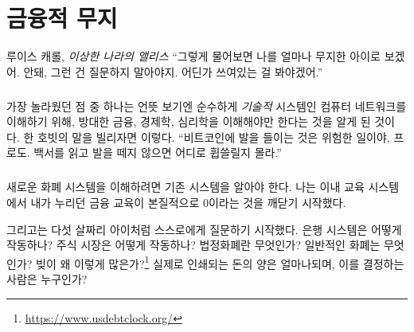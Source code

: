 \chapter{금융적 무지}
\label{les:8}

\begin{chapquote}{루이스 캐롤, \textit{이상한 나라의 앨리스}}
	\enquote{그렇게 물어보면 나를 얼마나 무지한 아이로 보겠어. 안돼, 그런 건 질문하지 말아야지. 어딘가 쓰여있는 걸 봐야겠어.}
\end{chapquote}

\paragraph{}
가장 놀라웠던 점 중 하나는 언뜻 보기엔 순수하게 \textit{기술적} 시스템인 컴퓨터 네트워크를 이해하기 위해, 
방대한 금융, 경제학, 심리학을 이해해야만 한다는 것을 알게 된 것이다.
한 호빗의 말을 빌리자면 이렇다. 
\enquote{비트코인에 발을 들이는 것은 위험한 일이야, 프로도. 백서를 읽고 발을 떼지 않으면 어디로 휩쓸릴지 몰라.}

\paragraph{}
새로운 화폐 시스템을 이해하려면 기존 시스템을 알아야 한다.  
나는 이내 교육 시스템에서 내가 누리던 금융 교육이 본질적으로 0이라는 것을 깨닫기 시작했다. 


그리고는 다섯 살짜리 아이처럼 스스로에게 질문하기 시작했다. 
은행 시스템은 어떻게 작동하나? 주식 시장은 어떻게 작동하나? 
법정화폐란 무엇인가? 일반적인 화폐는 무엇인가? 빚이 왜 이렇게 많은가?\footnote{\url{https://www.usdebtclock.org/}} 
실제로 인쇄되는 돈의 양은 얼마나되며, 이를 결정하는 사람은 누구인가?

